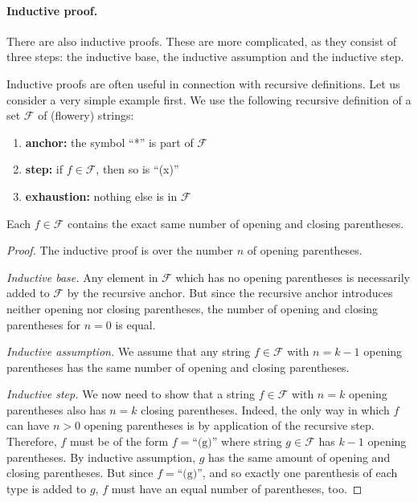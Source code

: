 \documentclass[nobib,nofonts]{tufte-handout}
\begin{document}
\paragraph{Inductive proof.}
There are also inductive proofs.
These are more complicated, as they consist of three steps: the inductive base, the inductive assumption and the inductive step.

Inductive proofs are often useful in connection with recursive definitions.
Let us consider a very simple example first.
We use the following recursive definition of a set $\mathcal{F}$ of (flowery) strings:

\begin{enumerate}
  \item \textbf{anchor:} the symbol ``*'' is part of $\mathcal{F}$
  \item \textbf{step:} if $f \in \mathcal{F}$, then so is ``(x)''
  \item \textbf{exhaustion:} nothing else is in $\mathcal{F}$
\end{enumerate}


\begin{proposition}
  Each $f \in \mathcal{F}$ contains the exact same number of opening and closing parentheses.
\end{proposition}

\begin{proof}
  The inductive proof is over the number $n$ of opening parentheses.

  \emph{Inductive base.}
  Any element in $\mathcal{F}$ which has no opening parentheses is necessarily added to $\mathcal{F}$ by the recursive anchor. But since the recursive anchor introduces neither opening nor closing parentheses, the number of opening and closing parentheses for $n=0$ is equal.

  \emph{Inductive assumption.} We assume that any string $f \in \mathcal{F}$ with $n = k-1$ opening parentheses has the same number of opening and closing parentheses.

  \emph{Inductive step.}
  We now need to show that a string $f \in \mathcal{F}$ with $n=k$ opening parentheses also has $n=k$ closing parentheses.
  Indeed, the only way in which $f$ can have $n>0$ opening parentheses is by application of the recursive step.
  Therefore, $f$ must be of the form $f = \text{``(g)''}$ where string $g \in \mathcal{F}$ has $k-1$ opening parentheses.
  By inductive assumption, $g$ has the same amount of opening and closing parentheses.
  But since $f = \text{``(g)''}$, and so exactly one parenthesis of each type is added to $g$, $f$ must have an equal number of parentheses, too.
\end{proof}
\end{document}
